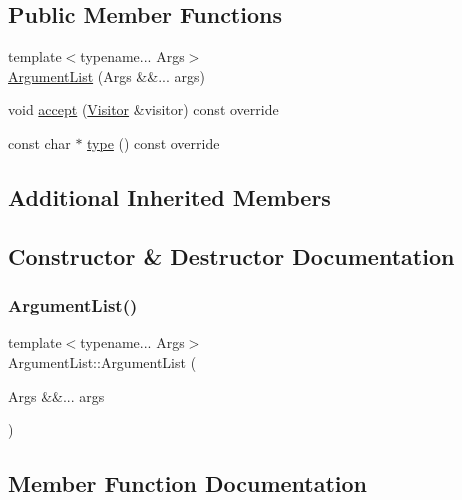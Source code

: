 \subsection*{Public Member Functions}
\begin{DoxyCompactItemize}
\item 
{\footnotesize template$<$typename... Args$>$ }\\\hyperlink{struct_argument_list_a7df7f5009c8fc56cede100d66e45cb93}{Argument\+List} (Args \&\&... args)
\item 
void \hyperlink{struct_argument_list_af99815001d6a741b4a9fb0330971a7dc}{accept} (\hyperlink{struct_visitor}{Visitor} \&visitor) const override
\item 
const char $\ast$ \hyperlink{struct_argument_list_a40d37153eb093deadf7045b1ad5ae1fa}{type} () const override
\end{DoxyCompactItemize}
\subsection*{Additional Inherited Members}


\subsection{Constructor \& Destructor Documentation}
\mbox{\label{struct_argument_list_a7df7f5009c8fc56cede100d66e45cb93}} 
\subsubsection{\texorpdfstring{Argument\+List()}{ArgumentList()}}
{\footnotesize\ttfamily template$<$typename... Args$>$ \\
Argument\+List\+::\+Argument\+List (\begin{DoxyParamCaption}\item[{Args \&\&...}]{args }\end{DoxyParamCaption})\hspace{0.3cm}{\ttfamily [inline]}}



\subsection{Member Function Documentation}
\mbox{\label{struct_argument_list_af99815001d6a741b4a9fb0330971a7dc}} 
